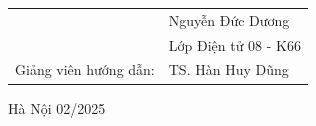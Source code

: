 \begin{titlepage}
\begin{center}
\begin{table}[H]
\begin{tabular}{l l}
                 &\fontsize{14pt}{0pt}\selectfont Nguyễn Đức Dương  \\
                 &\fontsize{14pt}{0pt}\selectfont Lớp Điện tử 08 - K66 \vspace{6pt} \\
               \fontsize{14pt}{0pt}\selectfont Giảng viên hướng dẫn: & \fontsize{14pt}{0pt}\selectfont TS. Hàn Huy Dũng \\   
          \end{tabular}
     \end{table}
     \vspace{1.3cm} %
     \fontsize{14pt}{0pt}\selectfont Hà Nội 02/2025
     \end{center}
     \end{titlepage}
     
     \cleardoublepage
     
     
